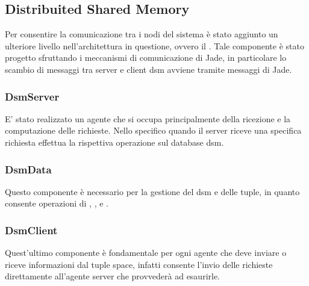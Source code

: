 \subsection{Distribuited Shared Memory}
Per consentire la comunicazione tra i nodi del sistema è stato aggiunto un ulteriore livello nell'architettura in questione, ovvero il . Tale componente è stato progetto sfruttando i meccanismi di comunicazione di Jade, in particolare lo scambio di messaggi tra server e client dsm avviene tramite messaggi di Jade.
\subsubsection{DsmServer}
E' stato realizzato un agente che si occupa principalmente della ricezione e la computazione delle richieste. Nello specifico quando il server riceve una specifica richiesta effettua la rispettiva operazione sul database dsm.
\subsubsection{DsmData}
Questo componente è necessario per la gestione del dsm e delle tuple, in quanto consente operazioni di , ,  e .
\subsubsection{DsmClient}
Quest'ultimo componente è fondamentale per ogni agente che deve inviare o riceve informazioni dal tuple space, infatti consente l'invio delle richieste direttamente all'agente server che provvederà ad esaurirle.